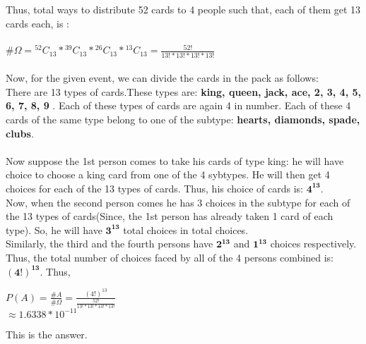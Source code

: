 \documentclass{article}
\newcommand*{\Comb}[2]{{}^{#1}C_{#2}}%
\begin{document}
Thus, total ways to distribute 52 cards to 4 people such that, each of them get 13 cards each, is :
\\
\\
$\# \Omega=\Comb{52}{13} * \Comb{39}{13} * \Comb{26}{13} * \Comb{13}{13} = \frac{52!}{13! * 13! * 13! * 13!}$
\\
\\
Now, for the given event, we can divide the cards in the pack as follows: \\
There are 13 types of cards.These types are: \textbf{king, queen, jack, ace, 2, 3, 4, 5, 6, 7, 8, 9 }.
Each of these types of cards are again 4 in number. Each of these 4 cards of the same type belong to one of the subtype: \textbf{hearts, diamonds, spade, clubs}.\\
\\
Now suppose the 1st person comes to take his cards of type king: he will have choice to choose a king card from one of the 4 sybtypes. He will then get 4 choices for each of the 13 types of cards.
Thus, his choice of cards is: $\mathbf{4^{13}}$.
\\
Now, when the second person comes he has 3 choices in the subtype for each of the 13 types of cards(Since, the 1st person has already taken 1 card of each type). So, he will have $\mathbf{3^{13}}$ total choices in total choices.\\
Similarly, the third and the fourth persons have $\mathbf{2^{13}}$ and $\mathbf{1^{13}}$ choices respectively.
Thus, the total number of choices faced by all of the 4 persons combined is: $\mathbf{(4!)^{13}}$.
Thus,
\begin{center}
      $P(A)=\frac{\# A}{\# \Omega}=\frac{(4!)^{13}}{\frac{52!}{13! * 13! * 13! * 13!}}$
      \\
      $\approx 1.6338*10^{-11}$
\end{center}
This is the answer.
\end{document}
